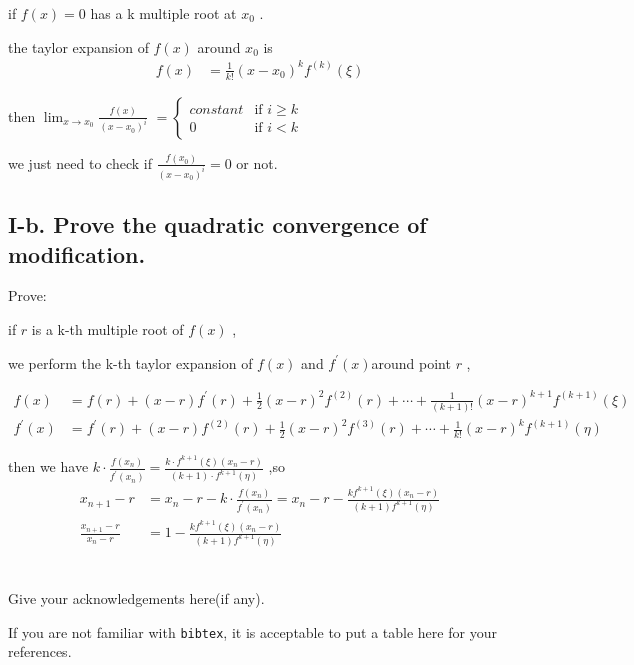 \documentclass[a4paper]{article}
\begin{document}
if $f(x)=0$ has a k multiple root at $x_{0}$ .

the taylor expansion of $f(x)$ around $x_{0}$ is 
\begin{align}
f(x) &= \frac{1}{k!}(x-x_{0})^{k}f^{(k)}(\xi)
\end{align}

then $\lim_{x \to x_{0}} \frac{f(x)}{(x-x_{0})^{i}}$
$
 = \left\{
\begin{array}{ll}
constant & \text{if } i \geq k \\
0 & \text{if } i < k
\end{array}
\right.
$

we just need to check if $\frac{f(x_{0})}{(x-x_{0})^{i}}=0$ or not.

\subsection*{I-b. Prove the quadratic convergence of modification.}
Prove:

if $r$ is a k-th multiple root of $f(x)$ ,

we perform the k-th taylor expansion of $f(x)$ and $f^{'}(x)$around point $r$ ,

\begin{align}
  f(x) &= f(r)+(x-r)f^{'}(r)+\frac{1}{2}(x-r)^2f^{(2)}(r)+\cdots + \frac{1}{(k+1)!}(x-r)^{k+1}f^{(k+1)}(\xi) \\
  f^{'}(x) &= f^{'}(r)+(x-r)f^{(2)}(r) + \frac{1}{2}(x-r)^2f^{(3)}(r)+\cdots+\frac{1}{k!}(x-r)^{k}f^{(k+1)}(\eta) 
\end{align}

then we have $k\cdot \frac{f(x_{n})}{f^{'}(x_{n})}=\frac{k \cdot f^{k+1}(\xi)(x_{n}-r)}{(k+1)\cdot f^{k+1}(\eta)}$ ,so 
\begin{align}
x_{n+1}-r &=x_{n}-r-k\cdot \frac{f(x_{n})}{f^{'}(x_{n})}=x_{n}-r-\frac{kf^{k+1}(\xi)(x_{n}-r)}{(k+1)f^{k+1}(\eta)} \\
\frac{x_{n+1}-r}{x_{n}-r} &= 1-\frac{kf^{k+1}(\xi)(x_{n}-r)}{(k+1)f^{k+1}(\eta)} 
\end{align}

\section*{  }
Give your acknowledgements here(if any).


\printbibliography

If you are not familiar with \texttt{bibtex}, 
it is acceptable to put a table here for your references.
\end{document}
